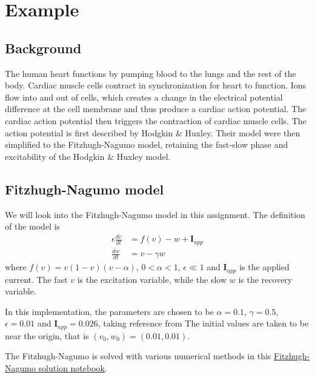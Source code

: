 \chapter{Example}
\label{chap:fitzhugh-nagumo}
\section{Background}
The human heart functions by pumping blood to the lungs and the rest of the body. Cardiac muscle cells contract in synchronization for heart to function. Ions flow into and out of cells, which creates a change in the electrical potential difference at the cell membrane and thus produce a cardiac action potential. The cardiac action potential then triggers the contraction of cardiac muscle cells. The action potential is first described by Hodgkin \& Huxley. 
Their model were then simplified to the Fitzhugh-Nagumo model, retaining the fast-slow phase and excitability of the Hodgkin \& Huxley model. %

\section{Fitzhugh-Nagumo model}
We will look into the Fitzhugh-Nagumo model in this assignment. The definition of the model is
\begin{align}
    \epsilon \frac{dv}{dt} &= f(v) - w + \mathbf{I}_{app} \\
    \frac{dw}{dt} &= v - \gamma w
\end{align}
where $f(v) = v(1-v)(v-\alpha)$, $0 < \alpha < 1$, $\epsilon \ll 1$ and $\mathbf{I}_{app}$ is the applied current. The fast $v$ is the excitation variable, while the slow $w$ is the recovery variable.

In this implementation, the parameters are chosen to be $\alpha = 0.1$, $\gamma = 0.5$, $\epsilon = 0.01$ and $\mathbf{I}_{app} = 0.026$, taking reference from %
The initial values are taken to be near the origin, that is $(v_0, w_0) = (0.01, 0.01)$. 

The Fitzhugh-Nagumo is solved with various numerical methods in this \href{https://nbviewer.jupyter.org/github/FarmHJ/numerical-solver/blob/main/examples/fitzhugh_nagumo.ipynb}{Fitzhugh-Nagumo solution notebook}. 

